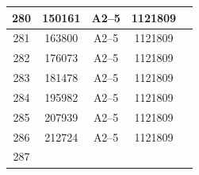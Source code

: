 \documentclass[UTF8,10pt,a4paper,fontset=fandol]{ctexart}
\newcommand{\fieldvalue}[1]{#1}
\begin{document}
\begin{tabular}{|c|c|c|c|p{2.5cm}|}
\hline
\fieldvalue{280} &
\fieldvalue{150161} &
\fieldvalue{A2--5} &
\fieldvalue{1121809} & \\
\hline
\fieldvalue{281} &
\fieldvalue{163800} &
\fieldvalue{A2--5} &
\fieldvalue{1121809} & \\
\hline
\fieldvalue{282} &
\fieldvalue{176073} &
\fieldvalue{A2--5} &
\fieldvalue{1121809} & \\
\hline
\fieldvalue{283} &
\fieldvalue{181478} &
\fieldvalue{A2--5} &
\fieldvalue{1121809} & \\
\hline
\fieldvalue{284} &
\fieldvalue{195982} &
\fieldvalue{A2--5} &
\fieldvalue{1121809} & \\
\hline
\fieldvalue{285} &
\fieldvalue{207939} &
\fieldvalue{A2--5} &
\fieldvalue{1121809} & \\
\hline
\fieldvalue{286} &
\fieldvalue{212724} &
\fieldvalue{A2--5} &
\fieldvalue{1121809} & \\
\hline
\fieldvalue{287} &

\end{tabular}
\end{document}
